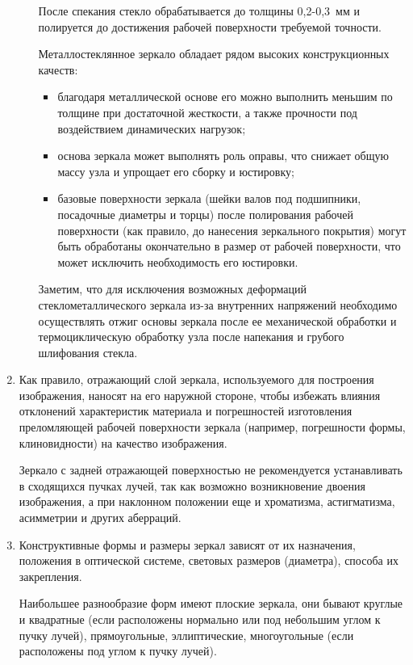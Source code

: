 \begin{enumerate}[leftmargin=*]
\begin{itemize}
После спекания стекло обрабатывается до толщины 0,2-0,3~мм и полируется до достижения рабочей поверхности требуемой точности.

Металлостеклянное зеркало обладает рядом высоких конструкционных качеств:

\begin{itemize}
\item благодаря металлической основе его можно выполнить меньшим по толщине при достаточной жесткости, а также прочности под воздействием динамических нагрузок;
\item основа зеркала может выполнять роль оправы, что снижает общую массу узла и упрощает его сборку и юстировку;
\item базовые поверхности зеркала (шейки валов под подшипники, посадочные диаметры и торцы) после полирования рабочей поверхности (как правило, до нанесения зеркального покрытия) могут быть обработаны окончательно в размер от рабочей поверхности, что может исключить необходимость его юстировки.
\end{itemize}

Заметим, что для исключения возможных деформаций стеклометаллического зеркала из-за внутренних напряжений необходимо осуществлять отжиг основы зеркала после ее механической обработки и термоциклическую обработку узла после напекания и грубого шлифования стекла.

\end{itemize}

\item Как правило, отражающий слой зеркала, используемого для построения изображения, наносят на его наружной стороне, чтобы избежать влияния отклонений характеристик материала и погрешностей изготовления преломляющей рабочей поверхности зеркала (например, погрешности формы, клиновидности) на качество изображения.

Зеркало с задней отражающей поверхностью не рекомендуется устанавливать в сходящихся пучках лучей, так как возможно возникновение двоения изображения, а при наклонном положении еще и хроматизма, астигматизма, асимметрии и других аберраций.

\item Конструктивные формы и размеры зеркал зависят от их назначения, положения в оптической системе, световых размеров (диаметра), способа их закрепления.

Наибольшее разнообразие форм имеют плоские зеркала, они бывают круглые и квадратные (если расположены нормально или под небольшим углом к пучку лучей), прямоугольные, эллиптические, многоугольные (если расположены под углом к пучку лучей).


\end{enumerate}
